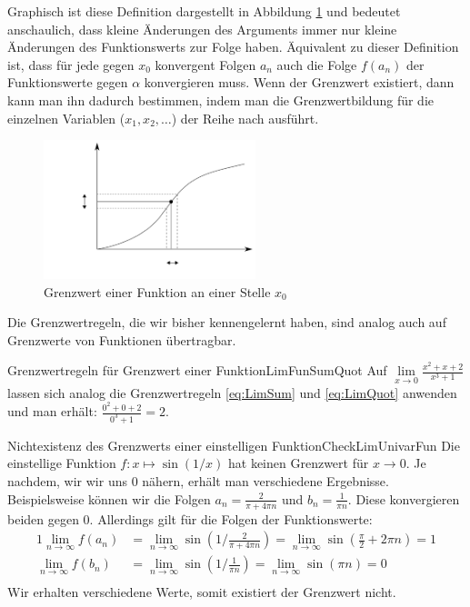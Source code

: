 Graphisch ist diese Definition dargestellt in Abbildung \ref{fig:LimFun} und bedeutet anschaulich, dass kleine Änderungen des Arguments immer nur kleine Änderungen des Funktionswerts zur Folge haben. Äquivalent zu dieser Definition ist, dass für jede gegen $x_0$ konvergent Folgen $a_n$ auch die Folge $f(a_n)$ der Funktionswerte gegen $\alpha$ konvergieren muss. Wenn der Grenzwert existiert, dann kann man ihn dadurch bestimmen, indem man die Grenzwertbildung für die einzelnen Variablen ($x_1, x_2, \dots$) der Reihe nach ausführt.

\begin{figure}
    \centering
    \includegraphics[width=0.55\textwidth]{./svg/definition-convergence-point}
    \caption{Grenzwert einer Funktion an einer Stelle $x_0$}
    \label{fig:LimFun}
\end{figure}

Die Grenzwertregeln, die wir bisher kennengelernt haben, sind analog auch auf Grenzwerte von Funktionen übertragbar.

\begin{example}{Grenzwertregeln für Grenzwert einer Funktion}{LimFunSumQuot}
    Auf $\lim\limits_{x\to 0} \frac{x^2+x+2}{x^3+1}$ lassen sich analog die Grenzwertregeln \ref{eq:LimSum} und \ref{eq:LimQuot} anwenden und man erhält: $\frac{0^2+0+2}{0^3+1} = 2$.
\end{example}

\begin{example}{Nichtexistenz des Grenzwerts einer einstelligen Funktion}{CheckLimUnivarFun}
    Die einstellige Funktion $f: x \mapsto \sin(1/x)$ hat keinen Grenzwert für $x \to 0$. Je nachdem, wir wir uns $0$ nähern, erhält man verschiedene Ergebnisse. Beispielsweise können wir die Folgen $a_n = \frac{2}{\pi+4\pi n}$ und $b_n = \frac{1}{\pi n}$. Diese konvergieren beiden gegen $0$. Allerdings gilt für die Folgen der Funktionswerte:
    \begin{alignat}{1}
       \lim\limits_{n\to\infty} f(a_n) &= \lim\limits_{n\to\infty} \sin\left(1 / \frac{2}{\pi+4\pi n}\right) = \lim\limits_{n\to\infty} \sin(\frac{\pi}{2} + 2\pi n) = 1 \\
       \lim\limits_{n\to\infty} f(b_n) &= \lim\limits_{n\to\infty} \sin\left(1 / \frac{1}{\pi n}\right) = \lim\limits_{n\to\infty} \sin(\pi n) = 0 \\
    \end{alignat}
    Wir erhalten verschiedene Werte, somit existiert der Grenzwert nicht.
\end{example}

